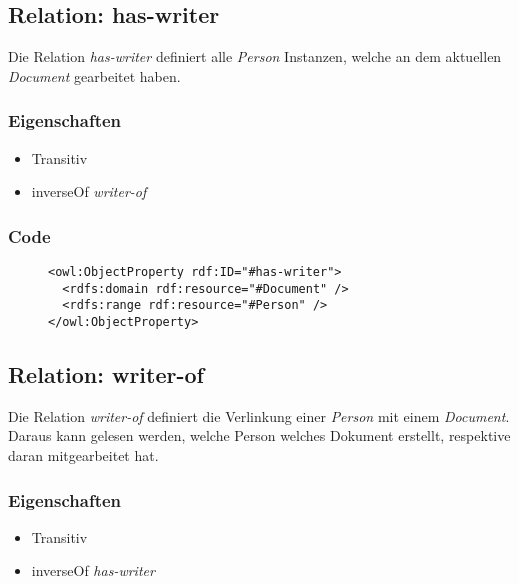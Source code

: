 \documentclass[
    11pt,
    latin1,
    a4paper,
    oneside
]{scrreprt}
\begin{document}
\subsection{Relation: has-writer} \label{sec:rel_haswriter}

Die Relation \emph{has-writer} definiert alle \emph{Person} Instanzen, welche an dem aktuellen \emph{Document} gearbeitet haben.

\subsubsection{Eigenschaften} \label{sec:rel_haswriter_settings}

\begin{itemize}
  \item Transitiv
  \item inverseOf \emph{writer-of}
\end{itemize}

\subsubsection{Code} \label{sec:rel_haswriter_code}

\begin{figure}[h]
 \lstset{language=XML}
 \begin{lstlisting}[label=owl:haswriter,caption={Die Relation \emph{has-writer} gibt an, welche \emph{Person} an dem \emph{Document} geschrieben hat}]
<owl:ObjectProperty rdf:ID="#has-writer">
  <rdfs:domain rdf:resource="#Document" />
  <rdfs:range rdf:resource="#Person" />
</owl:ObjectProperty>
 \end{lstlisting}
\end{figure}


\subsection{Relation: writer-of} \label{sec:rel_writerof}

Die Relation \emph{writer-of} definiert die Verlinkung einer \emph{Person} mit einem \emph{Document}. Daraus kann gelesen werden, welche Person welches Dokument erstellt, respektive daran mitgearbeitet hat.

\subsubsection{Eigenschaften} \label{sec:rel_writerof_settings}

\begin{itemize}
  \item Transitiv
  \item inverseOf \emph{has-writer}
\end{itemize}
\end{document}
